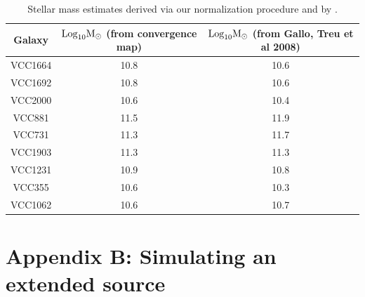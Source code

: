 \begin{table}
	\centering
	\label{table:stellar_mass}
	\caption[Inferred stellar masses]{Stellar mass estimates derived via our normalization procedure and by \citet{Gallo++08}.}
	\begin{tabular}{c c c}
		\hline
		Galaxy & $\rm{Log}_{10} M_{\odot}$ (from convergence map) & $\rm{Log}_{10} M_{\odot}$ (from Gallo, Treu et al 2008)\\
		\hline
		VCC1664 & 10.8 & 10.6 \\
		VCC1692 & 10.8 & 10.6 \\
		VCC2000 & 10.6 & 10.4 \\
		VCC881 & 11.5 & 11.9 \\
		VCC731 & 11.3 & 11.7 \\
		VCC1903 & 11.3 & 11.3 \\ 
		VCC1231 & 10.9 & 10.8 \\ 
		VCC355 & 10.6 & 10.3 \\
		VCC1062 & 10.6 & 10.7 \\
		\hline 
	\end{tabular}
\end{table}

\section{Appendix B: Simulating an extended source}
\label{app:B}


